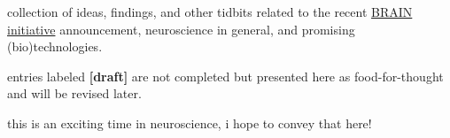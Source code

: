 

% 



	\maketitle
	\cssoutput
	\googleanalytics
			\lbpsepline
			collection of ideas, findings, and other tidbits related to the recent \href{http://www.nih.gov/science/brain/}{BRAIN initiative} announcement, neuroscience in general, and promising (bio)technologies.

			entries labeled \textbf{[draft]} are not completed but presented here as food-for-thought and will be revised later.

			this is an exciting time in neuroscience, i hope to convey that here!
			\lbpsepline
			\tableofcontents
			
			\lbpsepline
			
			\lbpsepline
			
			\lbpsepline
			
